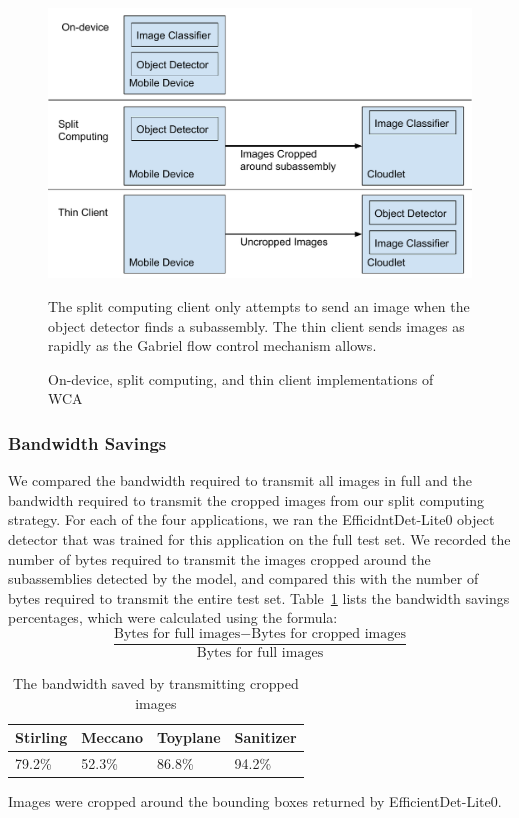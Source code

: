 \begin{figure}
  \includegraphics[width=\textwidth]{figures/split_edge.pdf}
  \begin{captiontext}
    The split computing client only attempts to send an image when the
    object detector finds a subassembly.
    The thin client sends images as rapidly as the Gabriel flow control
    mechanism allows.
  \end{captiontext}
  \caption{
    On-device, split computing, and thin client implementations of WCA
  }\label{fig:split_edge}
\end{figure}

\subsubsection{Bandwidth Savings}

We compared the bandwidth required to transmit all images in full and the
bandwidth required to transmit the cropped images from our split computing
strategy.
For each of the four applications, we ran the EfficidntDet-Lite0 object detector
that was trained for this application on the full test set.
We recorded the number of bytes required to transmit the images cropped around
the subassemblies detected by the model, and compared this with the number of
bytes required to transmit the entire test set.
Table~\ref{tab:bandwidth} lists the bandwidth savings percentages, which were
calculated using the formula:
\[
  \frac{\text{Bytes for full images} - \text{Bytes for cropped images}}{
    \text{Bytes for full images}}
\]

\begin{table}
  \begin{tabular}{|l|l|l|l|}
  \hline
  Stirling & Meccano & Toyplane & Sanitizer\\
  \hline
  \hline
  79.2\% & 52.3\% & 86.8\% & 94.2\%\\
  \hline
  \end{tabular}
  \begin{captiontext}
    Images were cropped around the bounding boxes returned by
    EfficientDet-Lite0.
  \end{captiontext}
\caption{
  The bandwidth saved by transmitting cropped images
}\label{tab:bandwidth}
\vspace{-0.2in}
\end{table}

